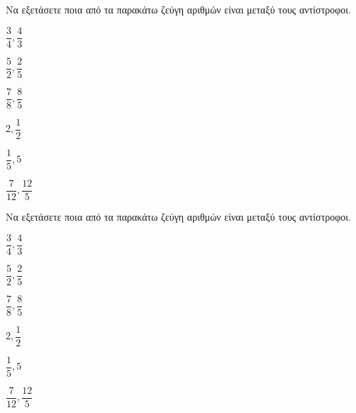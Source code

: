 Να εξετάσετε ποια από τα παρακάτω ζεύγη αριθμών είναι μεταξύ τους αντίστροφοι.
\begin{multicols}{3}
\begin{alist}
\item $ \dfrac{3}{4},\dfrac{4}{3} $
\item $ \dfrac{5}{2},\dfrac{2}{5} $
\item $ \dfrac{7}{8},\dfrac{8}{5} $
\item $ 2,\dfrac{1}{2} $
\item $ \dfrac{1}{5},5 $
\item $ \dfrac{7}{12},\dfrac{12}{5} $
\end{alist}
\end{multicols}
Να εξετάσετε ποια από τα παρακάτω ζεύγη αριθμών είναι μεταξύ τους αντίστροφοι.
\begin{multicols}{3}
\begin{alist}
\item $ \dfrac{3}{4},\dfrac{4}{3} $
\item $ \dfrac{5}{2},\dfrac{2}{5} $
\item $ \dfrac{7}{8},\dfrac{8}{5} $
\item $ 2,\dfrac{1}{2} $
\item $ \dfrac{1}{5},5 $
\item $ \dfrac{7}{12},\dfrac{12}{5} $
\end{alist}
\end{multicols}

